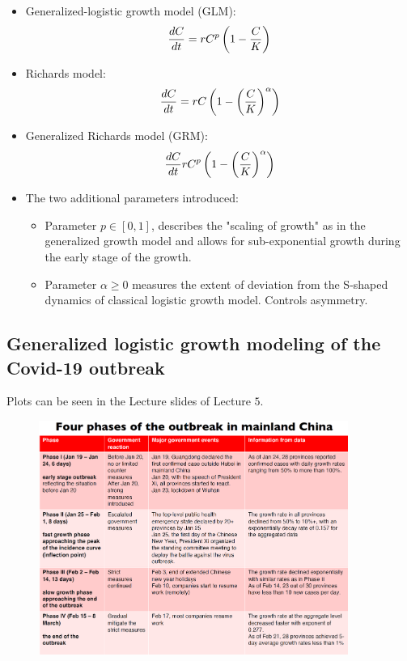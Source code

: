 \begin{itemize}
    \item Generalized-logistic growth model (GLM):
        \begin{align*}
            \frac{dC}{dt} = r C^p \left( 1 - \frac{C}{K} \right)
        \end{align*}
    \item Richards model:
        \begin{align*}
            \frac{dC}{dt} = r C \left( 1 - \left( \frac{C}{K} \right)^\alpha \right)
        \end{align*}
    \item Generalized Richards model (GRM):
        \begin{align*}
            \frac{dC}{dt} r C^p \left( 1 - \left( \frac{C}{K} \right)^\alpha \right)
        \end{align*}
    \item The two additional parameters introduced:
        \begin{itemize}
            \item Parameter $p \in [0,1]$, describes the "scaling of growth"
                as in the generalized growth model and allows for sub-exponential
                growth during the early stage of the growth.
            \item Parameter $\alpha \geq 0$ measures the extent of deviation from the
                S-shaped dynamics of classical logistic growth model. Controls
                asymmetry.
        \end{itemize}
\end{itemize}

\pagebreak

\subsection{Generalized logistic growth modeling of the Covid-19 outbreak}

Plots can be seen in the Lecture slides of Lecture $5$.

\begin{figure}[h]
    \centering
    \includegraphics[width=0.9\textwidth]{Pictures/four_phases_of_the_outbreak_in_mainland_china.png}
\end{figure}

